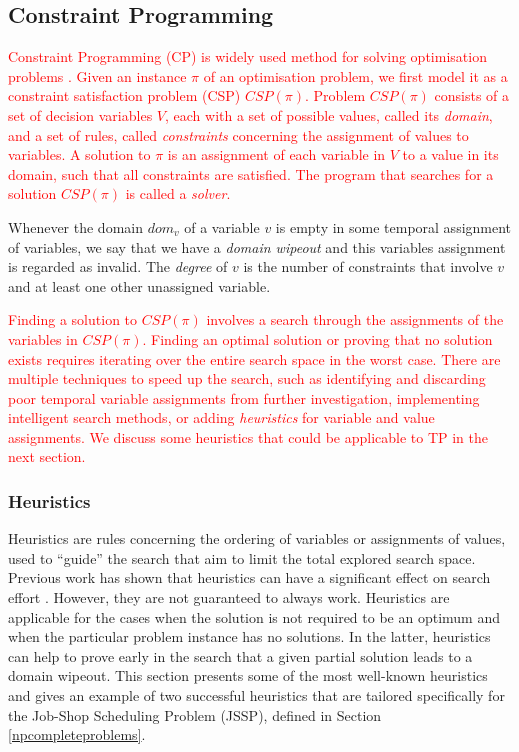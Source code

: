 \documentclass{mprop}
\theoremstyle{definition}
\begin{document}
\subsection{Constraint Programming}
\label{cp}
\textcolor{red}{
Constraint Programming (CP) is widely used method for solving optimisation problems \citep{Caseau97, Manlove07, Mcdonald02}. Given an instance $\pi$ of an optimisation problem, we first model it as a constraint satisfaction problem (CSP) $CSP(\pi)$. Problem $CSP(\pi)$ consists of a set of decision variables $V$, each with a set of possible values, called its \textit{domain}, and a set of rules, called \textit{constraints} concerning the assignment of values to variables. A solution to $\pi$ is an assignment of each variable in $V$ to a value in its domain, such that all constraints are satisfied. The program that searches for a solution $CSP(\pi)$ is called a \textit{solver}.}

Whenever the domain $dom_{v}$ of a variable $v$ is empty in some temporal assignment of variables, we say that we have a \textit{domain wipeout} and this variables assignment is regarded as invalid. The \textit{degree} of $v$ is the number of constraints that involve $v$ and at least one other unassigned variable.

\textcolor{red}{
Finding a solution to $CSP(\pi)$ involves a search through the assignments of the variables in $CSP(\pi)$. Finding an optimal solution or proving that no solution exists requires iterating over the entire search space in the worst case. There are multiple techniques to speed up the search, such as identifying and discarding poor temporal variable assignments from further investigation, implementing intelligent search methods, or adding \textit{heuristics} for variable and value assignments. We discuss some heuristics that could be applicable to TP in the next section.}

\subsubsection{Heuristics}
Heuristics are rules concerning the ordering of variables or assignments of values, used to ``guide'' the search that aim to limit the total explored search space. Previous work has shown that heuristics can have a significant effect on search effort \citep{Haralick80:a, Gent96}. However, they are not guaranteed to always work. Heuristics are applicable for the cases when the solution is not required to be an optimum and when the particular problem instance has no solutions. In the latter, heuristics can help to prove early in the search that a given partial solution leads to a domain wipeout. This section presents some of the most well-known heuristics and gives an example of two successful heuristics that are tailored specifically for the Job-Shop Scheduling Problem (JSSP), defined in Section \ref{npcompleteproblems}.
\end{document}
